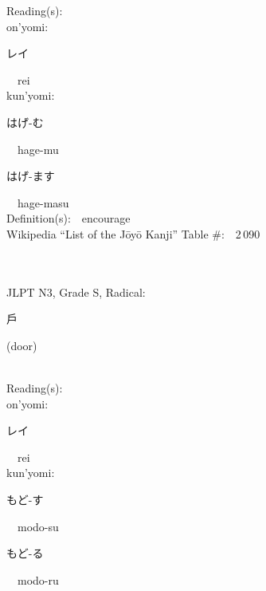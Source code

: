 \begin{multicols}{2}
Reading(s):\ \ \\
{\hspace*{1em}}on'yomi:\ \ \\
{\hspace*{2em}}{\begin{CJK}{UTF8}{min} レイ \end{CJK}}\ \ rei\ \ \\
{\hspace*{1em}}kun'yomi:\ \ \\
{\hspace*{2em}}{\begin{CJK}{UTF8}{min} はげ-む \end{CJK}}\ \ hage-mu\ \ \\
{\hspace*{2em}}{\begin{CJK}{UTF8}{min} はげ-ます \end{CJK}}\ \ hage-masu\ \ \\
Definition(s):\ \ encourage \\
Wikipedia ``List of the J\=oy\=o Kanji'' Table \#:\ \ 2\,090 \\
\ \ \\
{\fontsize{34pt}{40pt}  }\ \ \\  %
{JLPT N3, Grade S, Radical:\ \ {\begin{CJK}{UTF8}{min} 戶 \end{CJK}} (door) } \\
Reading(s):\ \ \\
{\hspace*{1em}}on'yomi:\ \ \\
{\hspace*{2em}}{\begin{CJK}{UTF8}{min} レイ \end{CJK}}\ \ rei\ \ \\
{\hspace*{1em}}kun'yomi:\ \ \\
{\hspace*{2em}}{\begin{CJK}{UTF8}{min} もど-す \end{CJK}}\ \ modo-su\ \ \\
{\hspace*{2em}}{\begin{CJK}{UTF8}{min} もど-る \end{CJK}}\ \ modo-ru\ \ \\

\end{multicols}
